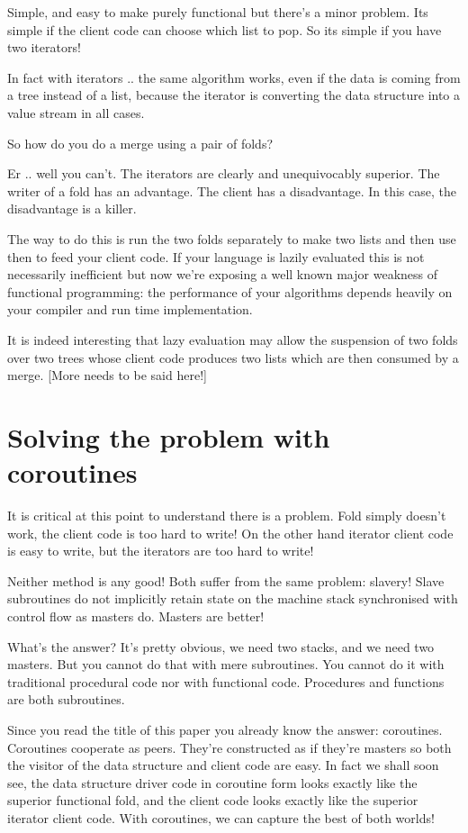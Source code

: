\documentclass[oneside]{book}
\begin{document}
Simple, and easy to make purely functional but there's a minor
problem. Its simple if the client code can choose which list to pop.
So its simple if you have two iterators! 

In fact with iterators .. the same algorithm works, even if the data
is coming from a tree instead of a list, because the iterator is
converting the data structure into a value stream in all cases.

So how do you do a merge using a pair of folds?

Er .. well you can't. The iterators are clearly and unequivocably
superior. The writer of a fold has an advantage. The client has
a disadvantage. In this case, the disadvantage is a killer.

The way to do this is run the two folds separately to make two lists
and then use then to feed your client code. If your language is lazily
evaluated this is not necessarily inefficient but now we're exposing
a well known major weakness of functional programming: the performance
of your algorithms depends heavily on your compiler and run time
implementation.

It is indeed interesting that lazy evaluation may allow the suspension
of two folds over two trees whose client code produces two lists which
are then consumed by a merge. [More needs to be said here!]

\section{Solving the problem with coroutines}
It is critical at this point to understand there is a problem.
Fold simply doesn't work, the client code is too hard to write!
On the other hand iterator client code is easy to write, but
the iterators are too hard to write!

Neither method is any good! Both suffer from the same problem:
slavery! Slave subroutines do not implicitly retain state on the
machine stack synchronised with control flow as masters do.
Masters are better! 

What's the answer? It's pretty obvious, we need two stacks, and we
need two masters. But you cannot do that with mere subroutines.
You cannot do it with traditional procedural code nor with
functional code. Procedures and functions are both subroutines.

Since you read the title of this paper you already know the answer:
coroutines. Coroutines cooperate as peers. They're constructed as if they're
masters so both the visitor of the data structure and client code are
easy. In fact we shall soon see, the data structure driver code in
coroutine form looks exactly like the superior functional fold,
and the client code looks exactly like the superior iterator client code.
With coroutines, we can capture the best of both worlds!
\end{document}
